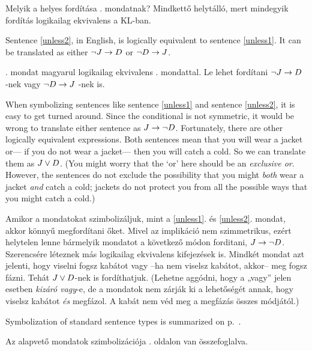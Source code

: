 Melyik a helyes fordítása . mondatnak? Mindkettő helytálló, mert mindegyik fordítás logikailag ekvivalens a KL-ban.

Sentence \ref{unless2}, in English, is logically equivalent to sentence \ref{unless1}. It can be translated as either $\neg J \rightarrow D$ or $\neg D \rightarrow J$.

. mondat magyarul logikailag ekvivalens . mondattal. Le lehet fordítani $\neg J \rightarrow D$ -nek vagy $\neg D \rightarrow J$ -nek is.

When symbolizing sentences like sentence \ref{unless1} and sentence \ref{unless2}, it is easy to get turned around. Since the conditional is not symmetric, it would be wrong to translate either sentence as $J \rightarrow \neg D$. Fortunately, there are other logically equivalent expressions. Both sentences mean that you will wear a jacket or--- if you do not wear a jacket--- then you will catch a cold. So we can translate them as $J \vee D$. (You might worry that the `or' here should be an \emph{exclusive or}. However, the sentences do not exclude the possibility that you might \emph{both} wear a jacket \emph{and} catch a cold; jackets do not protect you from all the possible ways that you might catch a cold.)

Amikor a mondatokat szimbolizáljuk, mint a \ref{unless1}. és \ref{unless2}. mondat, akkor könnyű megfordítani őket. Mivel az implikáció nem szimmetrikus, ezért helytelen lenne bármelyik mondatot a következő módon forditani, $J \rightarrow \neg D$. Szerencsére léteznek más logikailag ekvivalens kifejezések is. Mindkét mondat azt jelenti, hogy viselni fogsz kabátot vagy --ha nem viselsz kabátot, akkor-- meg fogsz fázni. Tehát $J \vee D$-nek is fordíthatjuk. (Lehetne aggódni, hogy a „vagy” jelen esetben \emph{kizáró vagy}-e, de a mondatok nem zárják ki a lehetőségét annak, hogy viselsz kabátot \emph{és} megfázol. A kabát nem véd meg a megfázás összes módjától.)



Symbolization of standard sentence types is summarized on p.~\pageref{app.symbolization}.

Az alapvető mondatok szimbolizációja . oldalon van összefoglalva.





